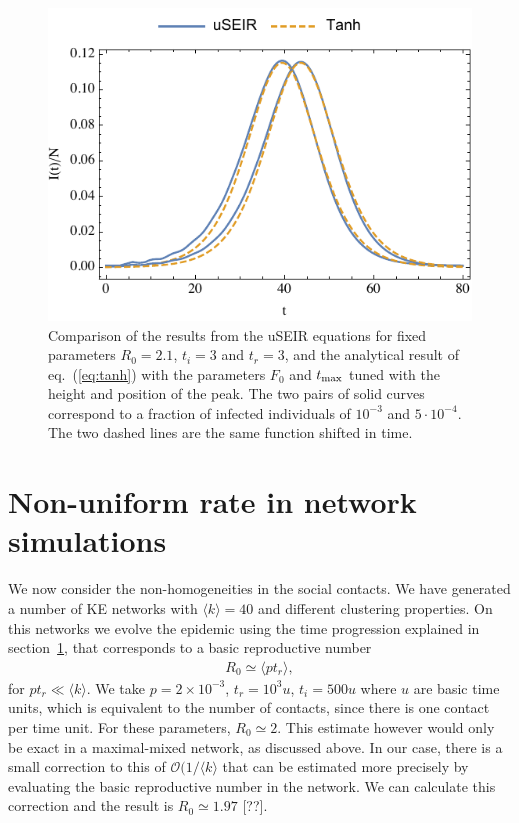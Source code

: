 \documentclass[a4paper,oneside,11pt]{article}
\newcommand{\mycomment}[1]{\textcolor[rgb]{0.75,0,0}{[#1]}}
\begin{document}
\begin{figure}[h!]
  \centering
  \includegraphics[width=12cm]{logistica.pdf}
  \caption{Comparison of the results from the uSEIR equations for fixed parameters $R_0=2.1$, $t_i=3$ and $t_r=3$, and the analytical result of  eq.~(\ref{eq:tanh}) with the parameters $F_0$ and $t_{\rm max}$ tuned with the height and position of the peak. The two pairs of solid curves correspond to a fraction of infected individuals of $10^{-3}$ and $5\cdot 10^{-4}$. The two dashed lines are the same function shifted in time.}
  \label{fig:logistic}
   \end{figure}

\section{Non-uniform rate in network simulations  }
\label{sec:net}

We now consider the non-homogeneities in the social contacts. 
We have generated a number of KE networks with $\langle k \rangle = 40$ and different clustering properties. On this networks we evolve the epidemic using the time progression explained in section~\ref{sec:net}, that corresponds to a basic reproductive number
\begin{eqnarray}
R_0 \simeq \langle p t_r \rangle,
\end{eqnarray}
for $p t_r \ll \langle k \rangle$.
We take $p=2 \times 10^{-3}$, $t_r= 10^3 u$, $t_i=500 u$ where $u$ are  basic time units, which is equivalent to the number of contacts, since there is one contact per time unit.  For these parameters, $R_0 \simeq 2$. 
This estimate however would only be exact in a maximal-mixed network, as discussed above. In our case, there is a small correction to this  of ${\mathcal O}(1/\langle k\rangle$ that can be estimated more precisely by evaluating the basic reproductive number in the network. 
We can calculate this correction and the result is $R_0 \simeq 1.97$ \mycomment{??}.
\end{document}
